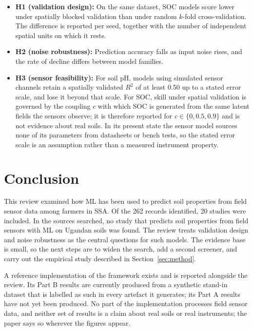 \documentclass[conference]{IEEEtran}
\begin{document}
\begin{itemize}
\item \textbf{H1 (validation design):} On the same dataset, SOC models score
lower under spatially blocked validation than under random $k$-fold
cross-validation. The difference is reported per seed, together with the number
of independent spatial units on which it rests.
\item \textbf{H2 (noise robustness):} Prediction accuracy falls as input noise
rises, and the rate of decline differs between model families.
\item \textbf{H3 (sensor feasibility):} For soil pH, models using simulated sensor
channels retain a spatially validated $R^2$ of at least 0.50 up to a stated error
scale, and lose it beyond that scale. For SOC, skill under spatial validation is
governed by the coupling $c$ with which SOC is generated from the same latent
fields the sensors observe; it is therefore reported for $c \in \{0, 0.5, 0.9\}$
and is not evidence about real soils. In its present state the sensor model
sources none of its parameters from datasheets or bench tests, so the stated
error scale is an assumption rather than a measured instrument property.
\end{itemize}

\section{Conclusion}
This review examined how ML has been used to predict soil properties from field
sensor data among farmers in SSA. Of the 262 records identified, 20 studies were
included. In the sources searched, no study that predicts soil properties from
field sensors with ML on Ugandan soils was found. The review treats validation
design and noise robustness as the central questions for such models. The
evidence base is small, so the next steps are to widen the search, add a second
screener, and carry out the empirical study described in
Section~\ref{sec:method}.

A reference implementation of the framework exists and is reported alongside the
review. Its Part B results are currently produced from a synthetic stand-in
dataset that is labelled as such in every artefact it generates; its Part A
results have not yet been produced. No part of the implementation processes field
sensor data, and neither set of results is a claim about real soils or real
instruments; the paper says so wherever the figures appear.
\end{document}
